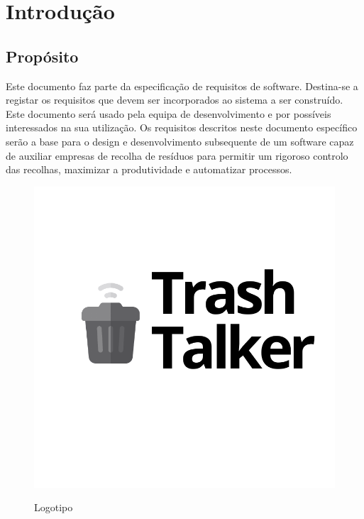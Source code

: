 \documentclass{scrreprt}
\begin{document}
	
	\chapter{Introdução}
	
	\section{Propósito}
	
	Este documento faz parte da especificação de requisitos de software. Destina-se a registar os requisitos que devem ser incorporados ao sistema a ser construído. Este documento 
	será usado pela equipa de desenvolvimento e por possíveis interessados na sua utilização.
	Os requisitos descritos neste documento específico serão a base para o design e 
	desenvolvimento subsequente de um software capaz de auxiliar empresas de recolha de resíduos para permitir um rigoroso controlo das recolhas,  maximizar a produtividade e automatizar processos.
	
	
	\begin{figure}[H]
		\centering
		\includegraphics[scale=.90]{imagens/Trash Talker copy.pdf}
		\par Logotipo
		\label{fig:Logotipo}
	\end{figure}
	
	\newpage
	
\end{document}
